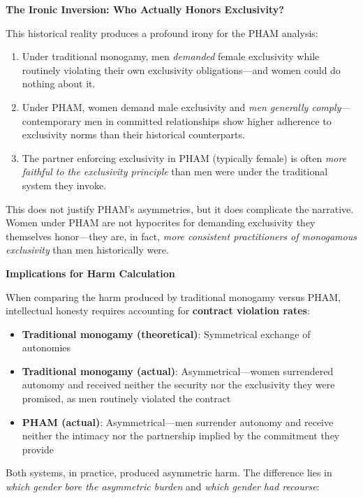 \documentclass[12pt,openany]{book}
\numberwithin{equation}{chapter}
\begin{document}
\textbf{The Ironic Inversion: Who Actually Honors Exclusivity?}

This historical reality produces a profound irony for the PHAM analysis:

\begin{enumerate}
    \item Under traditional monogamy, men \textit{demanded} female exclusivity while routinely violating their own exclusivity obligations---and women could do nothing about it.
    
    \item Under PHAM, women demand male exclusivity and \textit{men generally comply}---contemporary men in committed relationships show higher adherence to exclusivity norms than their historical counterparts.
    
    \item The partner enforcing exclusivity in PHAM (typically female) is often \textit{more faithful to the exclusivity principle} than men were under the traditional system they invoke.
\end{enumerate}

This does not justify PHAM's asymmetries, but it does complicate the narrative. Women under PHAM are not hypocrites for demanding exclusivity they themselves honor---they are, in fact, \textit{more consistent practitioners of monogamous exclusivity} than men historically were.

\textbf{Implications for Harm Calculation}

When comparing the harm produced by traditional monogamy versus PHAM, intellectual honesty requires accounting for \textbf{contract violation rates}:

\begin{itemize}
    \item \textbf{Traditional monogamy (theoretical)}: Symmetrical exchange of autonomies
    \item \textbf{Traditional monogamy (actual)}: Asymmetrical---women surrendered autonomy and received neither the security nor the exclusivity they were promised, as men routinely violated the contract
    \item \textbf{PHAM (actual)}: Asymmetrical---men surrender autonomy and receive neither the intimacy nor the partnership implied by the commitment they provide
\end{itemize}

Both systems, in practice, produced asymmetric harm. The difference lies in \textit{which gender bore the asymmetric burden} and \textit{which gender had recourse}:
\end{document}
